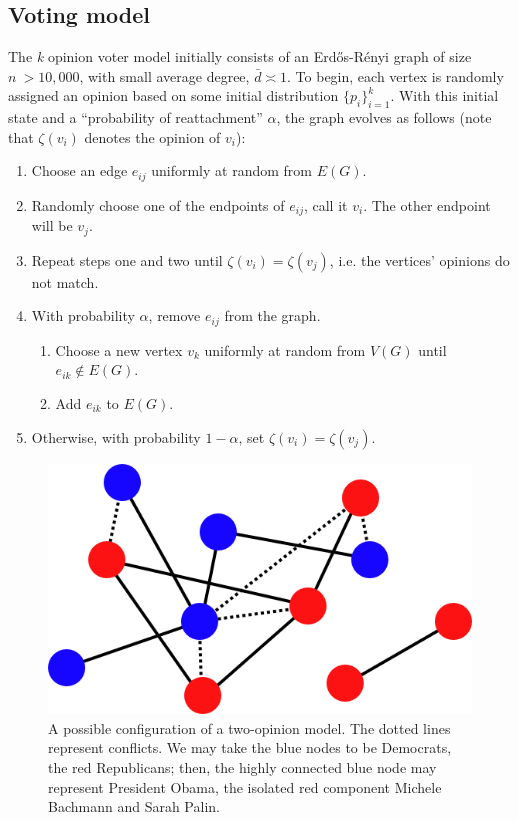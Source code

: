 \documentclass[11pt]{article}
\begin{document}
\subsection{Voting model}
\indent The \textit{k} opinion voter model initially consists of an Erd\H{o}s-R\'{e}nyi graph of size $n \ >10,000$, with small average degree, $\bar{d}\asymp 1$. To begin, each vertex is randomly assigned an opinion based on some initial distribution $\{p_{i}\}_{i=1}^{k}$. With this initial state and a ``probability of reattachment'' $\alpha$, the graph evolves as follows (note that $\zeta(v_{i})$ denotes the opinion of $v_{i}$):
\begin{enumerate}
\item Choose an edge $e_{ij}$ uniformly at random from $E(G)$.
\item Randomly choose one of the endpoints of $e_{ij}$, call it $v_{i}$. The other endpoint will be $v_{j}$.
\item Repeat steps one and two until $\zeta(v_{i}) = \zeta(v_{j})$, i.e. the vertices' opinions do not match.
\item With probability $\alpha$, remove $e_{ij}$ from the graph.
\begin{enumerate}
\item Choose a new vertex $v_{k}$ uniformly at random from $V(G)$ until $e_{ik} \notin E(G)$.
\item Add $e_{ik}$ to $E(G)$.
\end{enumerate}
\item Otherwise, with probability $1-\alpha$, set $\zeta(v_{i}) = \zeta(v_{j})$.
\end{enumerate}

\begin{figure}[h!]
  \centering
  \includegraphics[width=.3\linewidth]{votingModel}
  \caption{A possible configuration of a two-opinion model. The dotted lines represent conflicts. We may take the blue nodes to be Democrats, the red Republicans; then, the highly connected blue node may represent President Obama, the isolated red component Michele Bachmann and Sarah Palin.}
  \label{fig:graphA}
\end{figure}
\end{document}
